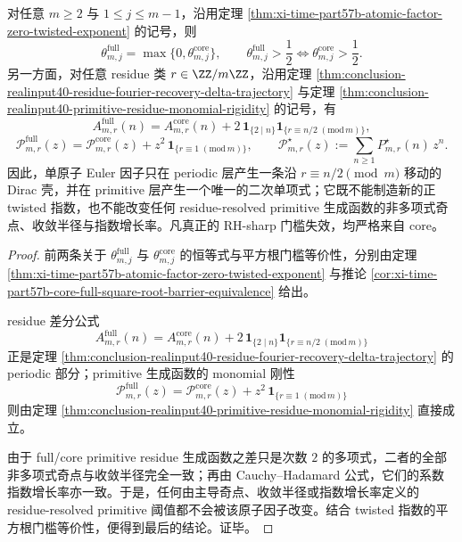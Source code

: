 \begin{theorem}\label{thm:xi-time-part9wa-core-generated-threshold-residue-shell}
对任意 \(m\ge 2\) 与 \(1\le j\le m-1\)，沿用定理 \ref{thm:xi-time-part57b-atomic-factor-zero-twisted-exponent} 的记号，则
\[
\theta_{m,j}^{\mathrm{full}}=\max\{0,\theta_{m,j}^{\mathrm{core}}\},
\qquad
\theta_{m,j}^{\mathrm{full}}>\frac12
\iff
\theta_{m,j}^{\mathrm{core}}>\frac12.
\]
另一方面，对任意 residue 类 \(r\in \ZZ/m\ZZ\)，沿用定理 \ref{thm:conclusion-realinput40-residue-fourier-recovery-delta-trajectory} 与定理 \ref{thm:conclusion-realinput40-primitive-residue-monomial-rigidity} 的记号，有
\[
A_{m,r}^{\mathrm{full}}(n)
=
A_{m,r}^{\mathrm{core}}(n)
+2\,\mathbf 1_{\{2\mid n\}}\mathbf 1_{\{r\equiv n/2\;(\mathrm{mod}\,m)\}},
\]
\[
\mathcal P_{m,r}^{\mathrm{full}}(z)
=
\mathcal P_{m,r}^{\mathrm{core}}(z)
+z^2\,\mathbf 1_{\{r\equiv 1\;(\mathrm{mod}\,m)\}},
\qquad
\mathcal P_{m,r}^{\star}(z):=\sum_{n\ge 1}P_{m,r}^{\star}(n)\,z^n.
\]
因此，单原子 Euler 因子只在 periodic 层产生一条沿 \(r\equiv n/2\pmod m\) 移动的 Dirac 壳，并在 primitive 层产生一个唯一的二次单项式；它既不能制造新的正 twisted 指数，也不能改变任何 residue-resolved primitive 生成函数的非多项式奇点、收敛半径与指数增长率。凡真正的 RH-sharp 门槛失效，均严格来自 core。
\end{theorem}
\begin{proof}
前两条关于 \(\theta_{m,j}^{\mathrm{full}}\) 与 \(\theta_{m,j}^{\mathrm{core}}\) 的恒等式与平方根门槛等价性，分别由定理 \ref{thm:xi-time-part57b-atomic-factor-zero-twisted-exponent} 与推论 \ref{cor:xi-time-part57b-core-full-square-root-barrier-equivalence} 给出。

residue 差分公式
\[
A_{m,r}^{\mathrm{full}}(n)
=
A_{m,r}^{\mathrm{core}}(n)
+2\,\mathbf 1_{\{2\mid n\}}\mathbf 1_{\{r\equiv n/2\;(\mathrm{mod}\,m)\}}
\]
正是定理 \ref{thm:conclusion-realinput40-residue-fourier-recovery-delta-trajectory} 的 periodic 部分；primitive 生成函数的 monomial 刚性
\[
\mathcal P_{m,r}^{\mathrm{full}}(z)
=
\mathcal P_{m,r}^{\mathrm{core}}(z)
+z^2\,\mathbf 1_{\{r\equiv 1\;(\mathrm{mod}\,m)\}}
\]
则由定理 \ref{thm:conclusion-realinput40-primitive-residue-monomial-rigidity} 直接成立。

由于 full/core primitive residue 生成函数之差只是次数 \(2\) 的多项式，二者的全部非多项式奇点与收敛半径完全一致；再由 Cauchy--Hadamard 公式，它们的系数指数增长率亦一致。于是，任何由主导奇点、收敛半径或指数增长率定义的 residue-resolved primitive 阈值都不会被该原子因子改变。结合 twisted 指数的平方根门槛等价性，便得到最后的结论。证毕。
\end{proof}

